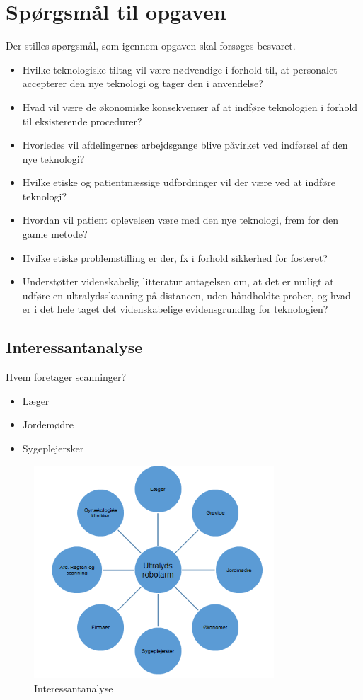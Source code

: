 
\raggedbottom


	\frontmatter
	
\chapter{Spørgsmål til opgaven}
Der stilles spørgsmål, som igennem opgaven skal forsøges besvaret.  
\begin{itemize}
	\item Hvilke teknologiske tiltag vil være nødvendige i forhold til, at personalet accepterer den nye teknologi og tager den i anvendelse? 
	\item Hvad vil være de økonomiske konsekvenser af at indføre teknologien i forhold til eksisterende procedurer? 
	\item Hvorledes vil afdelingernes arbejdsgange blive påvirket ved indførsel af den nye teknologi? 
	\item Hvilke etiske og patientmæssige udfordringer vil der være ved at indføre teknologi? 
	\item Hvordan vil patient oplevelsen være med den nye teknologi, frem for den gamle metode? 
	\item Hvilke etiske problemstilling er der, fx i forhold sikkerhed for fosteret? 
	\item Understøtter videnskabelig litteratur antagelsen om, at det er muligt at udføre en ultralydsskanning på
	distancen, uden håndholdte prober, og hvad er i det hele taget det videnskabelige evidensgrundlag for
	teknologien? 
	
\end{itemize}

\section{Interessantanalyse}
Hvem foretager scanninger? 
\begin{itemize}
	\item Læger
	\item Jordemødre 
	\item Sygeplejersker 
\end{itemize}

\begin{figure}[h!]\centering
	\includegraphics[width = 0.8\textwidth]{Figurer/interessantanalyse}
	\caption{Interessantanalyse}
	\label{interessantanalyse}
\end{figure}


